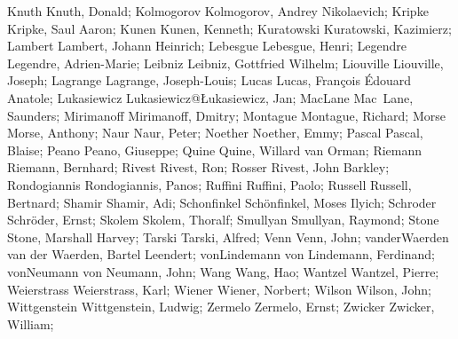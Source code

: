 \DefFriend Knuth            Knuth, Donald;
\DefFriend Kolmogorov       Kolmogorov, Andrey Nikolaevich;
\DefFriend Kripke           Kripke, Saul Aaron;
\DefFriend Kunen            Kunen, Kenneth;
\DefFriend Kuratowski       Kuratowski, Kazimierz;
\DefFriend Lambert          Lambert, Johann Heinrich;
\DefFriend Lebesgue         Lebesgue, Henri;
\DefFriend Legendre         Legendre, Adrien-Marie;
\DefFriend Leibniz          Leibniz, Gottfried Wilhelm;
\DefFriend Liouville        Liouville, Joseph;
\DefFriend Lagrange         Lagrange, Joseph-Louis;
\DefFriend Lucas            Lucas, François Édouard Anatole;
\DefFriend Lukasiewicz      Lukasiewicz@Łukasiewicz, Jan;
\DefFriend MacLane          Mac~Lane, Saunders;
\DefFriend Mirimanoff       Mirimanoff, Dmitry;
\DefFriend Montague         Montague, Richard;
\DefFriend Morse            Morse, Anthony;
\DefFriend Naur             Naur, Peter;
\DefFriend Noether          Noether, Emmy;
\DefFriend Pascal           Pascal, Blaise;
\DefFriend Peano            Peano, Giuseppe;
\DefFriend Quine            Quine, Willard van Orman;
\DefFriend Riemann          Riemann, Bernhard;
\DefFriend Rivest           Rivest, Ron;
\DefFriend Rosser           Rivest, John Barkley;
\DefFriend Rondogiannis     Rondogiannis, Panos;
\DefFriend Ruffini          Ruffini, Paolo;
\DefFriend Russell          Russell, Bertnard;
\DefFriend Shamir           Shamir, Adi;
\DefFriend Schonfinkel      Schönfinkel, Moses Ilyich;
\DefFriend Schroder         Schröder, Ernst;
\DefFriend Skolem           Skolem, Thoralf;
\DefFriend Smullyan         Smullyan, Raymond;
\DefFriend Stone            Stone, Marshall Harvey;
\DefFriend Tarski           Tarski, Alfred;
\DefFriend Venn             Venn, John;
\DefFriend vanderWaerden    van der Waerden, Bartel Leendert;
\DefFriend vonLindemann     von Lindemann, Ferdinand;
\DefFriend vonNeumann       von Neumann, John;
\DefFriend Wang             Wang, Hao;
\DefFriend Wantzel          Wantzel, Pierre;
\DefFriend Weierstrass      Weierstrass, Karl;
\DefFriend Wiener           Wiener, Norbert;
\DefFriend Wilson           Wilson, John;
\DefFriend Wittgenstein     Wittgenstein, Ludwig;
\DefFriend Zermelo          Zermelo, Ernst;
\DefFriend Zwicker          Zwicker, William;
